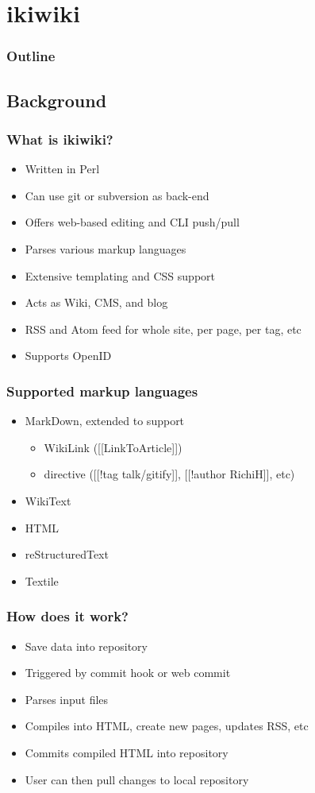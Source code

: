 \documentclass[t]{beamer}
\begin{document}
\section{ikiwiki}

\begin{frame}
	\frametitle{Outline}
	\tableofcontents[currentsection]
\end{frame}

\subsection{Background}

\begin{frame}
	\frametitle{What is ikiwiki?}
	\begin{itemize}
		\item Written in Perl
		\item Can use git or subversion as back-end
		\item Offers web-based editing and CLI push/pull
		\item Parses various markup languages
		\item Extensive templating and CSS support
		\item Acts as Wiki, CMS, and blog
		\item RSS and Atom feed for whole site, per page, per tag, etc
		\item Supports OpenID
	\end{itemize}
\end{frame}

\begin{frame}
	\frametitle{Supported markup languages}
	\begin{itemize}
		\item MarkDown, extended to support
		\begin{itemize}
			\item WikiLink ([[LinkToArticle]])
			\item directive ([[!tag talk/gitify]], [[!author RichiH]], etc)
		\end{itemize}
		\item WikiText
		\item HTML
		\item reStructuredText
		\item Textile
	\end{itemize}
\end{frame}

\begin{frame}
	\frametitle{How does it work?}
	\begin{itemize}
		\item Save data into repository
		\item Triggered by commit hook or web commit
		\item Parses input files
		\item Compiles into HTML, create new pages, updates RSS, etc
		\item Commits compiled HTML into repository
		\item User can then pull changes to local repository
	\end{itemize}
\end{frame}
\end{document}
